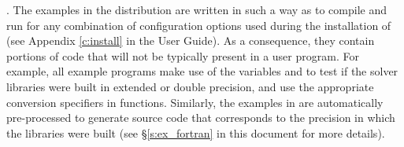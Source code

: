 \vspace{0.2in}. 
The examples in the {\kinsol} distribution are written in such a way as
to compile and run for any combination of configuration options used during
the installation of {\sundials} (see Appendix \ref{c:install} in the User Guide).
As a consequence, they contain portions of code that will not be typically present in a
user program. For example, all {\CC} example programs make use of the
variables  and 
to test if the solver libraries were built in extended or double precision, 
and use the appropriate conversion specifiers in  functions.
Similarly, the {\F} examples in {\fkinsol} are automatically
pre-processed to generate source code that corresponds to the
precision in which the {\kinsol} libraries were built (see
\S\ref{s:ex_fortran} in this document for more details).

